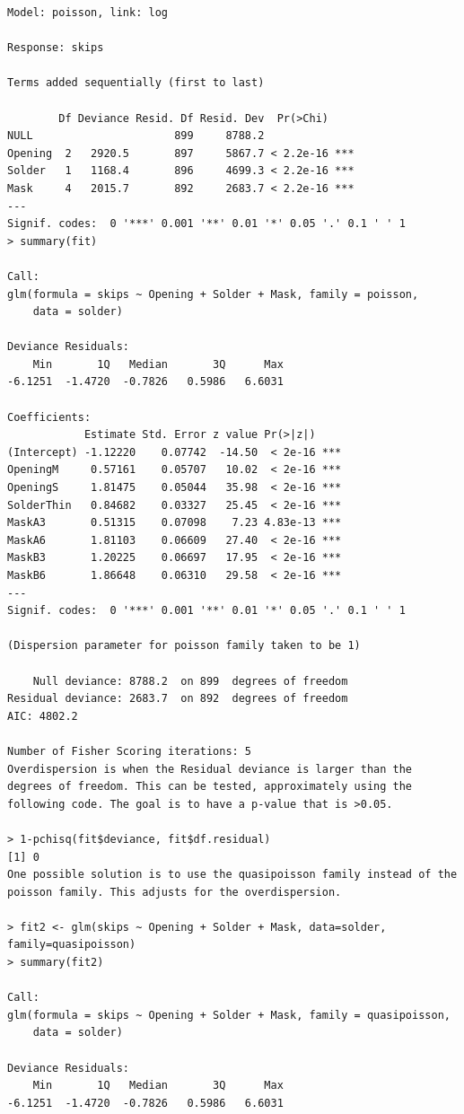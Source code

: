 \documentclass[
]{book}
\begin{document}
\begin{verbatim}
Model: poisson, link: log

Response: skips

Terms added sequentially (first to last)

        Df Deviance Resid. Df Resid. Dev  Pr(>Chi)    
NULL                      899     8788.2              
Opening  2   2920.5       897     5867.7 < 2.2e-16 ***
Solder   1   1168.4       896     4699.3 < 2.2e-16 ***
Mask     4   2015.7       892     2683.7 < 2.2e-16 ***
---
Signif. codes:  0 '***' 0.001 '**' 0.01 '*' 0.05 '.' 0.1 ' ' 1
> summary(fit)

Call:
glm(formula = skips ~ Opening + Solder + Mask, family = poisson, 
    data = solder)

Deviance Residuals: 
    Min       1Q   Median       3Q      Max  
-6.1251  -1.4720  -0.7826   0.5986   6.6031  

Coefficients:
            Estimate Std. Error z value Pr(>|z|)    
(Intercept) -1.12220    0.07742  -14.50  < 2e-16 ***
OpeningM     0.57161    0.05707   10.02  < 2e-16 ***
OpeningS     1.81475    0.05044   35.98  < 2e-16 ***
SolderThin   0.84682    0.03327   25.45  < 2e-16 ***
MaskA3       0.51315    0.07098    7.23 4.83e-13 ***
MaskA6       1.81103    0.06609   27.40  < 2e-16 ***
MaskB3       1.20225    0.06697   17.95  < 2e-16 ***
MaskB6       1.86648    0.06310   29.58  < 2e-16 ***
---
Signif. codes:  0 '***' 0.001 '**' 0.01 '*' 0.05 '.' 0.1 ' ' 1

(Dispersion parameter for poisson family taken to be 1)

    Null deviance: 8788.2  on 899  degrees of freedom
Residual deviance: 2683.7  on 892  degrees of freedom
AIC: 4802.2

Number of Fisher Scoring iterations: 5
Overdispersion is when the Residual deviance is larger than the degrees of freedom. This can be tested, approximately using the following code. The goal is to have a p-value that is >0.05.

> 1-pchisq(fit$deviance, fit$df.residual)
[1] 0
One possible solution is to use the quasipoisson family instead of the poisson family. This adjusts for the overdispersion.

> fit2 <- glm(skips ~ Opening + Solder + Mask, data=solder, family=quasipoisson)
> summary(fit2)

Call:
glm(formula = skips ~ Opening + Solder + Mask, family = quasipoisson, 
    data = solder)

Deviance Residuals: 
    Min       1Q   Median       3Q      Max  
-6.1251  -1.4720  -0.7826   0.5986   6.6031  


\end{verbatim}
\end{document}
